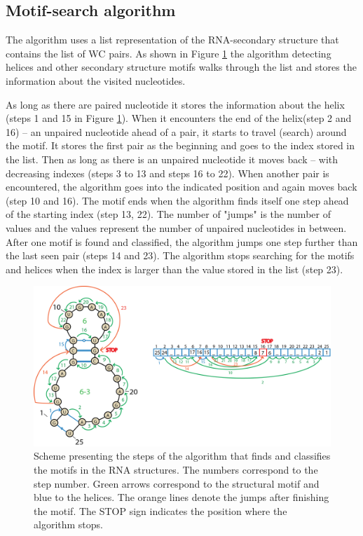 \documentclass[12pt]{article}
\begin{document}
\subsection{Motif-search algorithm}
The algorithm uses a list representation of the RNA-secondary structure that contains the list of WC pairs. As shown in Figure \ref{MotifsAlgorithm} the algorithm detecting helices and other secondary structure motifs walks through the list and stores the information about the visited nucleotides. 

As long as there are paired nucleotide it stores the information about the helix (steps 1 and 15 in Figure \ref{MotifsAlgorithm}). When it encounters the end of the helix(step 2 and 16) -- an unpaired nucleotide ahead of a pair, it starts to travel (search) around the motif. It stores the first pair as the beginning and goes to the index stored in the list. Then as long as there is an unpaired nucleotide it moves back -- with decreasing indexes (steps 3 to 13 and steps 16 to 22). When another pair is encountered, the algorithm goes into the indicated position and again moves back (step 10 and 16). The motif ends when the algorithm finds itself one step ahead of the starting index (step 13, 22). The number of "jumps" is the number of values and the values represent the number of unpaired nucleotides in between. After one motif is found and classified, the algorithm jumps one step further than the last seen pair (steps 14 and 23). The algorithm stops searching for the motifs and helices when the index is larger than the value stored in the list (step 23). 

\begin{figure}[h!]
\centering
\includegraphics[width =\textwidth]{./pictures/algorithm.png}
\caption{Scheme presenting the steps of the algorithm that finds and classifies the motifs in the RNA structures. The numbers correspond to the step number. Green arrows correspond to the structural motif and blue to the helices. The orange lines denote the jumps after finishing the motif. The STOP sign indicates the position where the algorithm stops.}
\label{MotifsAlgorithm}
\end{figure}
\end{document}
